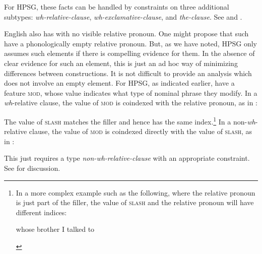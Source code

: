 \documentclass[output=paper]{langsci/langscibook}
\begin{document}
\ea\label{ex:borsley:4.12}
    \z
\z
%
For \gls{HPSG}, these facts can be handled by constraints on three additional
subtypes: \emph{wh-relative-clause}, \emph{wh-exclamative-clause}, and
\emph{the-clause}. See \citet{GinSag2000} and \citet{Sag2010}.

English also has  with no visible relative pronoun. One might
propose that such  have a phonologically empty relative
pronoun. But, as we have noted, \gls{HPSG} only assumes such elements if there
is compelling evidence for them. In the absence of clear evidence for such an
element, this is just an ad hoc way of minimizing differences between
constructions. It is not difficult to provide an analysis which does not involve
an empty element. For \gls{HPSG}, as
indicated earlier,  have a feature \textsc{mod}, whose value
indicates what type of nominal phrase they modify. In a \emph{wh}-relative
clause, the value of \textsc{mod} is coindexed with the relative pronoun, as in
:

\ea\label{ex:borsley:4.13}
\z
%
The value of \textsc{slash} matches the filler and hence has the same index.\footnote{In
    a more complex example such as the following, where the relative pronoun is
    just part of the filler, the value of \textsc{slash} and the relative pronoun will
    have different indices:

\begin{exe}
     whose brother I talked to
\end{exe}} In a non-\emph{wh}-relative clause, the value of \textsc{mod} is coindexed
directly with the value of \textsc{slash}, as in :

\ea\label{ex:borsley:4.14}
\z
%
This just requires a type \emph{non-wh-relative-clause} with an appropriate
constraint. See \citet{Sag1997} for discussion.
\end{document}
